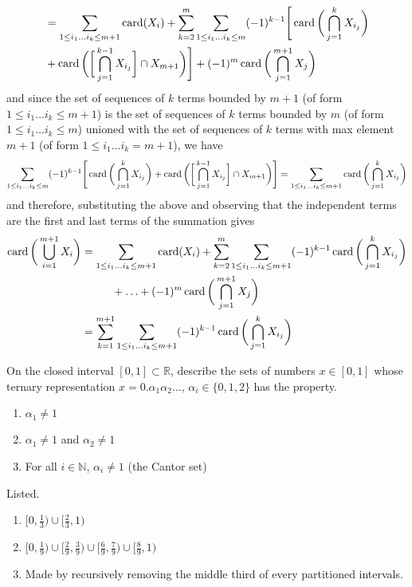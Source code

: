 \begin{solution}
\begin{align*}
      & = \sum_{1 \leq i_1 \ldots i_k \leq m+1} \operatorname{card}(X_i) + \sum_{k=2}^m \sum_{1 \leq i_1 \ldots i_k \leq m} (-1)^{k-1} \Bigg[ \operatorname{card}\bigg( \bigcap_{j=1}^k X_{i_j} \bigg) \\
      & +  \operatorname{card}\bigg( \bigg[ \bigcap_{j=1}^{k-1} X_{i_j} \bigg] \cap X_{m+1} \bigg) \Bigg] + (-1)^{m} \operatorname{card}\bigg( \bigcap_{j=1}^{m+1} X_j \bigg) 
    \end{align*}
    and since the set of sequences of $k$ terms bounded by $m+1$ (of form $1 \leq i_1 \ldots i_k \leq m+1$) is the set of sequences of $k$ terms bounded by $m$ (of form $1 \leq i_1 \ldots i_k \leq m$) unioned with the set of sequences of $k$ terms with max element $m+1$ (of form $1 \leq i_1 \ldots i_k = m+1$), we have 
    \[\sum_{1 \leq i_1 \ldots i_k \leq m} (-1)^{k-1} \Bigg[ \operatorname{card}\bigg( \bigcap_{j=1}^k X_{i_j} \bigg) +  \operatorname{card}\bigg( \bigg[ \bigcap_{j=1}^{k-1} X_{i_j} \bigg] \cap X_{m+1} \bigg) \Bigg] = \sum_{1 \leq i_1 \ldots i_k \leq m+1} \operatorname{card}\bigg( \bigcap_{j=1}^k X_{i_j} \bigg)\]
    and therefore, substituting the above and observing that the independent terms are the first and last terms of the summation gives 
    \begin{align*}
      \operatorname{card} \bigg( \bigcup_{i=1}^{m+1} X_i \bigg) & = \sum_{1 \leq i_1 \ldots i_k \leq m+1} \operatorname{card}(X_i) + \sum_{k=2}^m \sum_{1 \leq i_1 \ldots i_k \leq m+1} (-1)^{k-1} \operatorname{card}\bigg( \bigcap_{j=1}^k X_{i_j} \bigg) \\ 
      & \;\;\;\;\;\;\;\;\;\; + \ldots + (-1)^{m} \operatorname{card}\bigg( \bigcap_{j=1}^{m+1} X_j \bigg) \\
      & = \sum_{k=1}^{m+1} \sum_{1 \leq i_1 \ldots i_k \leq m+1} (-1)^{k-1} \operatorname{card}\bigg( \bigcap_{j=1}^k X_{i_j} \bigg) 
    \end{align*}
  \end{solution}

  \begin{exercise}[Zorich 2.4.7]
    On the closed interval $[0, 1] \subset \mathbb{R}$, describe the sets of numbers $x \in [0, 1]$ whose ternary representation $x = 0.\alpha_1 \alpha_2 \ldots $, $\alpha_i \in \{0, 1, 2\}$ has the property. 
    \begin{enumerate}
      \item $\alpha_1 \neq 1$
      \item $\alpha_1 \neq 1$ and $\alpha_2 \neq 1$ 
      \item For all $i \in \mathbb{N}$, $\alpha_i \neq 1$ (the Cantor set)
    \end{enumerate}
  \end{exercise}
  \begin{solution}
    Listed. 
    \begin{enumerate}
      \item $[0, \frac{1}{3}) \cup [\frac{2}{3}, 1)$ 
      \item $[0, \frac{1}{9}) \cup [\frac{2}{9}, \frac{3}{9}) \cup [\frac{6}{9}, \frac{7}{9}) \cup [\frac{8}{9}, 1)$
      \item Made by recursively removing the middle third of every partitioned intervals. 
    \end{enumerate}
  \end{solution}


